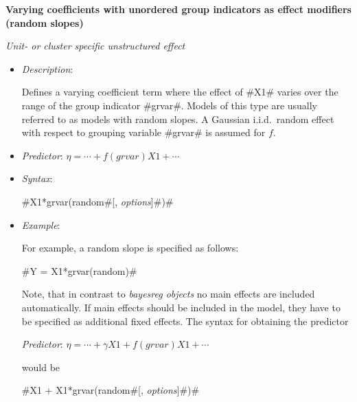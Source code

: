 



{\bf Varying coefficients with unordered group indicators as
effect modifiers (random slopes)}
\medskip

{\em Unit- or cluster specific unstructured effect}
\begin{itemize}
\item[] {\em Description}:

Defines a varying coefficient term where the effect of #X1# varies
over the range of the group indicator #grvar#. Models of this type
are usually referred to as models with random slopes. A Gaussian
i.i.d.~random effect with respect to grouping variable #grvar# is
assumed for $f$.
\item[] {\em Predictor}: $\eta = \cdots + f(grvar)X1 + \cdots$
\item[] {\em Syntax}:

#X1*grvar(random#[, {\em options}]#)#
\item[] {\em Example}:

For example, a random slope is specified as follows:

#Y = X1*grvar(random)#

Note, that in contrast to {\em bayesreg objects} no main effects
are included automatically. If main effects should be included in
the model, they have to be specified as additional fixed effects.
The syntax for obtaining the predictor

{\em Predictor}: $\eta = \cdots + \gamma X1 + f(grvar)X1 + \cdots$

would be

#X1 + X1*grvar(random#[, {\em options}]#)#

\end{itemize}


